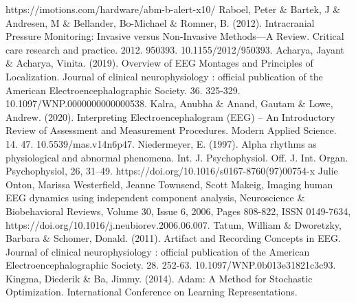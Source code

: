 \documentclass[12pt, a4paper, titlepage]{extreport}
\begin{document}
\begin{thebibliography}{00}
			https://imotions.com/hardware/abm-b-alert-x10/
			Raboel, Peter \& Bartek, J \& Andresen, M \& Bellander, Bo-Michael \& Romner, B. (2012). Intracranial Pressure Monitoring: Invasive versus Non-Invasive Methods—A Review. Critical care research and practice. 2012. 950393. 10.1155/2012/950393.
			Acharya, Jayant \& Acharya, Vinita. (2019). Overview of EEG Montages and Principles of Localization. Journal of clinical neurophysiology : official publication of the American Electroencephalographic Society. 36. 325-329. 10.1097/WNP.0000000000000538.  
			Kalra, Anubha \& Anand, Gautam \& Lowe, Andrew. (2020). Interpreting Electroencephalogram (EEG) – An Introductory Review of Assessment and Measurement Procedures. Modern Applied Science. 14. 47. 10.5539/mas.v14n6p47. 
			Niedermeyer, E. (1997). Alpha rhythms as physiological and abnormal phenomena. Int. J. Psychophysiol. Off. J.
			Int. Organ. Psychophysiol, 26, 31–49. https://doi.org/10.1016/s0167-8760(97)00754-x 
			Julie Onton, Marissa Westerfield, Jeanne Townsend, Scott Makeig,
			Imaging human EEG dynamics using independent component analysis,
			Neuroscience \& Biobehavioral Reviews,
			Volume 30, Issue 6,
			2006,
			Pages 808-822,
			ISSN 0149-7634,
			https://doi.org/10.1016/j.neubiorev.2006.06.007.
			Tatum, William \& Dworetzky, Barbara \& Schomer, Donald. (2011). Artifact and Recording Concepts in EEG. Journal of clinical neurophysiology : official publication of the American Electroencephalographic Society. 28. 252-63. 10.1097/WNP.0b013e31821c3c93. 
			Kingma, Diederik \& Ba, Jimmy. (2014). Adam: A Method for Stochastic Optimization. International Conference on Learning Representations. 
	\end{thebibliography} 
\end{document}
